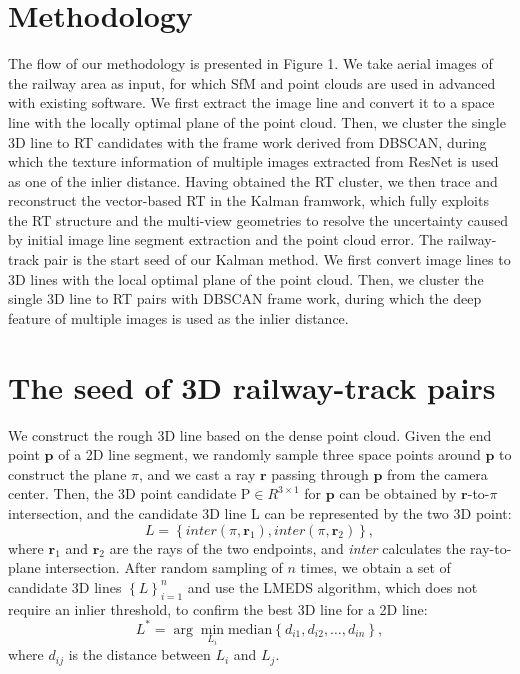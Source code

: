 \section{Methodology}

The flow of our methodology is presented in Figure 1.
We take aerial images of the railway area as input,
for which SfM and point clouds are used in advanced with existing software.
We first extract the image line and convert it to a space line with the locally optimal plane of the point cloud.
Then,
we cluster the single 3D line to RT candidates with the frame work derived from DBSCAN,  
during which the texture information of multiple images extracted from ResNet is used as one of the inlier distance.
Having obtained the RT cluster, 
we then trace and reconstruct the vector-based RT in the Kalman framwork,
which fully exploits the RT structure and the multi-view geometries to resolve the uncertainty caused by initial image line segment extraction and the point cloud error.
The railway-track pair is the start seed of our Kalman method.
We first convert image lines to 3D lines with the local optimal plane of the point cloud.
Then,
we cluster the single 3D line to RT pairs with DBSCAN frame work,  
during which the deep feature of multiple images is used as the inlier distance.


\section{The seed of 3D railway-track pairs}
We construct the rough 3D line based on the dense point cloud.
Given the end point $\mathbf p$ of a 2D line segment,
we randomly sample three space points around $\mathbf p$ to construct the plane $\pi$,
and we cast a ray $\mathbf r$ passing through $\mathbf p$ from the camera center.
Then,
the 3D point candidate $\mathrm P \in R ^ {3\times1}$ for $\mathbf p$ can be obtained by $\mathbf r$-to-$\pi$ intersection,
and the candidate 3D line $\mathrm L$ can be represented by the two 3D point:
\begin{equation}
    L =\left\{\textit{inter} \left(\pi,\mathbf r_1\right),\textit{inter} \left(\pi,\mathbf r_2\right)  \right\},
\end{equation}
where $\mathbf r_1$ and $\mathbf r_2$ are the rays of the two endpoints,
and \textit{inter} calculates the ray-to-plane intersection.
After random sampling of $n$ times,
we obtain a set of candidate 3D lines $\left\{ L\right\}_{i=1}^n$ and use the LMEDS algorithm,
which does not require an inlier threshold, to confirm the best 3D line for a 2D line:
\begin{equation}
    L^* = \arg\min_{L_i} \text{median} \left\{ d_{i1}, d_{i2}, \dots, d_{in}\right\} ,
\end{equation}
where $d_{ij}$ is the distance between $L_i$ and $L_j$.  

